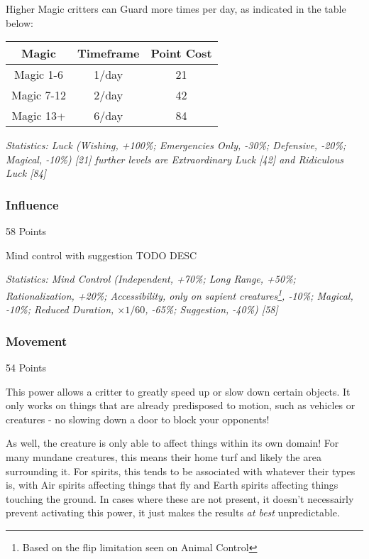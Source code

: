\begin{multicols*}{3}
	Higher Magic critters can Guard more times per day, as indicated in the table below:
	
	\begin{center}
		\begin{tabular}{|c|c|c|}
			\hline
			Magic & Timeframe & Point Cost\\
			\hline
			\hline
			Magic 1-6 & 1/day & 21 \\
			Magic 7-12 & 2/day & 42 \\
			Magic 13+ & 6/day & 84 \\
			\hline
		\end{tabular}
	\end{center}
	
	\textcolor{OliveGreen}{\textit{Statistics: Luck (Wishing, +100\%; Emergencies Only, -30\%; Defensive, -20\%; Magical, -10\%) [21] further levels are Extraordinary Luck [42] and Ridiculous Luck [84]}}
	
	
	\subsubsection{Influence}\label{influence}
	\begin{flushright}
		58 Points
	\end{flushright}
	
	Mind control with suggestion
	TODO DESC
	
	
	\textcolor{OliveGreen}{\textit{Statistics: Mind Control (Independent, +70\%; Long Range, +50\%; Rationalization, +20\%; Accessibility, only on sapient creatures\footnote{Based on the flip limitation seen on Animal Control}, -10\%; Magical, -10\%; Reduced Duration, \(\times1/60\), -65\%; Suggestion, -40\%) [58]}}
	
	
	\subsubsection{Movement}\label{movement}
	\begin{flushright}
		54 Points
	\end{flushright}
	
	This power allows a critter to greatly speed up or slow down certain objects. It only works on things that are already predisposed to motion, such as vehicles or creatures - no slowing down a door to block your opponents! 
	
	As well, the creature is only able to affect things within its own domain! For many mundane creatures, this means their home turf and likely the area surrounding it. For spirits, this tends to be associated with whatever their types is, with Air spirits affecting things that fly and Earth spirits affecting things touching the ground. In cases where these are not present, it doesn't necessairly prevent activating this power, it just makes the results \textit{at best} unpredictable.
	

\end{multicols*}
